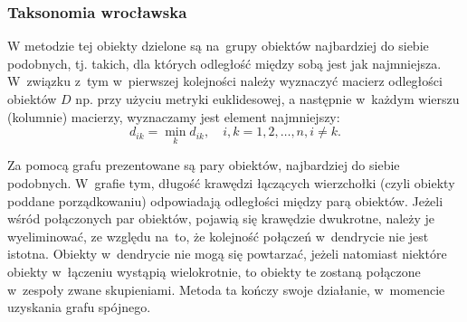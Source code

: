 \documentclass[12pt,a4paper]{report}
\begin{document}
\subsubsection{Taksonomia wrocławska}


W metodzie tej obiekty dzielone są na~grupy obiektów najbardziej do siebie podobnych, tj. takich, dla których odległość między sobą jest jak najmniejsza. W~związku z~tym w~pierwszej kolejności należy wyznaczyć macierz odległości obiektów $D$ np. przy użyciu metryki euklidesowej, a następnie w~każdym wierszu (kolumnie) macierzy, wyznaczamy jest element najmniejszy: 
$$
d_{ik}= \min\limits_{k} {d_{ik}}, \quad i,k=1,2,\dots,n, i\neq k.
$$

Za pomocą grafu prezentowane są pary obiektów, najbardziej do siebie podobnych. W~grafie tym, długość krawędzi łączących wierzchołki (czyli obiekty poddane porządkowaniu) odpowiadają odległości między parą obiektów. Jeżeli wśród połączonych par obiektów, pojawią się krawędzie dwukrotne, należy je wyeliminować, ze względu na~to, że kolejność połączeń w~dendrycie nie jest istotna. Obiekty w~dendrycie nie mogą się powtarzać, jeżeli natomiast niektóre obiekty w~łączeniu wystąpią wielokrotnie, to obiekty te zostaną połączone w~zespoły zwane skupieniami. Metoda ta kończy swoje działanie, w~momencie uzyskania grafu spójnego. 
\end{document}
